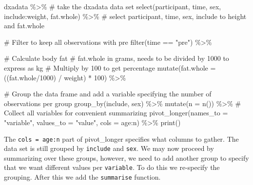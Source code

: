 \documentclass[
  11pt,
  letterpaper,
]{scrbook}
\newenvironment{Shaded}{\begin{snugshade}}{\end{snugshade}}
\newcommand{\AttributeTok}[1]{\textcolor[rgb]{0.40,0.45,0.13}{#1}}
\newcommand{\CommentTok}[1]{\textcolor[rgb]{0.37,0.37,0.37}{#1}}
\newcommand{\DecValTok}[1]{\textcolor[rgb]{0.68,0.00,0.00}{#1}}
\newcommand{\FunctionTok}[1]{\textcolor[rgb]{0.28,0.35,0.67}{#1}}
\newcommand{\NormalTok}[1]{\textcolor[rgb]{0.00,0.23,0.31}{#1}}
\newcommand{\SpecialCharTok}[1]{\textcolor[rgb]{0.37,0.37,0.37}{#1}}
\newcommand{\StringTok}[1]{\textcolor[rgb]{0.13,0.47,0.30}{#1}}
\begin{document}
\begin{Shaded}
\begin{Highlighting}[numbers=left,,]
\NormalTok{dxadata }\SpecialCharTok{\%\textgreater{}\%} \CommentTok{\# take the dxadata data set}
  \FunctionTok{select}\NormalTok{(participant, time, sex, include}\SpecialCharTok{:}\NormalTok{weight, fat.whole) }\SpecialCharTok{\%\textgreater{}\%} 
  \CommentTok{\# select participant, time, sex, include to height and fat.whole}
  
  \CommentTok{\# Filter to keep all observations with pre}
  \FunctionTok{filter}\NormalTok{(time }\SpecialCharTok{==} \StringTok{"pre"}\NormalTok{) }\SpecialCharTok{\%\textgreater{}\%}
  
  \CommentTok{\# Calculate body fat}
  \CommentTok{\# fat.whole in grams, needs to be divided by 1000 to express as kg}
  \CommentTok{\# Multiply by 100 to get percentage}
  \FunctionTok{mutate}\NormalTok{(}\AttributeTok{fat.whole =}\NormalTok{ ((fat.whole}\SpecialCharTok{/}\DecValTok{1000}\NormalTok{) }\SpecialCharTok{/}\NormalTok{ weight) }\SpecialCharTok{*} \DecValTok{100}\NormalTok{) }\SpecialCharTok{\%\textgreater{}\%}
  
  \CommentTok{\# Group the data frame and add a variable specifying the number of observations per group}
  \FunctionTok{group\_by}\NormalTok{(include, sex) }\SpecialCharTok{\%\textgreater{}\%}
  \FunctionTok{mutate}\NormalTok{(}\AttributeTok{n =} \FunctionTok{n}\NormalTok{()) }\SpecialCharTok{\%\textgreater{}\%}
  \CommentTok{\# Collect all variables for convenient summarizing}
  \FunctionTok{pivot\_longer}\NormalTok{(}\AttributeTok{names\_to =} \StringTok{"variable"}\NormalTok{, }
               \AttributeTok{values\_to =} \StringTok{"value"}\NormalTok{, }
               \AttributeTok{cols =}\NormalTok{ age}\SpecialCharTok{:}\NormalTok{n) }\SpecialCharTok{\%\textgreater{}\%}
  \FunctionTok{print}\NormalTok{()}
\end{Highlighting}
\end{Shaded}

The \texttt{cols\ =\ age:n} part of pivot\_longer specifies what columns
to gather. The data set is still grouped by \texttt{include} and
\texttt{sex}. We may now proceed by summarizing over these groups,
however, we need to add another group to specify that we want different
values per \texttt{variable}. To do this we re-specify the grouping.
After this we add the \texttt{summarise} function.
\end{document}
